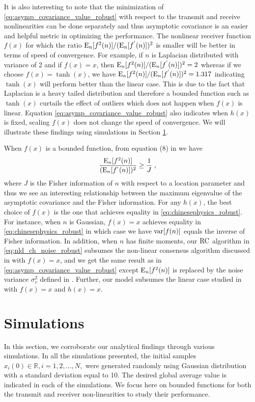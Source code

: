 \documentclass[onecolumn, draft, 12pt]{IEEEtran}
\newcommand{\E}{{\rm E}}
\newcommand{\R}{\mathbb{R}}
\newcommand{\rnld}{\rm RC}
\begin{document}
It is also interesting to note that the minimization of \eqref{eq:asymp_covariance_value_robust} with respect to the transmit and receive nonlinearities can be done separately and thus asymptotic covariance is an easier and helpful metric in optimizing the performance. The nonlinear receiver function $f(x)$ for which the ratio $ \E_n [f^2(n)] / (\E_n[f^{'}(n)])^2 $ is smaller will be better in terms of speed of convergence. For example, if $n$ is Laplacian distributed with variance of 2 and if $f(x)=x$, then $\E_n [f^2(n)] / (\E_n[f^{'}(n)])^2 =2$ whereas if we choose $f(x)=\tanh(x)$, we have $\E_n [f^2(n)] / (\E_n[f^{'}(n)])^2 =1.317$ indicating $\tanh(x)$ will perform better than the linear case. This is due to the fact that Laplacian is a heavy tailed distribution and therefore a bounded function such as $\tanh(x)$ curtails the effect of outliers which does not happen when $f(x)$ is linear. Equation \eqref{eq:asymp_covariance_value_robust} also indicates when $h(x)$ is fixed, scaling $f(x)$ does not change the speed of convergence. We will illustrate these findings using simulations in Section \ref{sec:simulations_nld_robust}. 

When $f(x)$ is a bounded function, from equation (8) in \cite{chinesephysics} we have
\begin{equation}
\label{eq:chinesephysics_robust}
\frac{\E_n [f^2(n)]}{(\E_n[f^{'}(n)])^2} \geq \frac{1}{J} \;,
\end{equation}
where $J$ is the Fisher information of $n$ with respect to a location parameter \cite[(8)]{zamir} and thus we see an interesting relationship between the maximum eigenvalue of the asymptotic covariance and the Fisher information. For any $h(x)$, the best choice of $f(x)$ is the one that achieves equality in \eqref{eq:chinesephysics_robust}. For instance, when $n$ is Gaussian, $f(x)=x$ achieves equality in \eqref{eq:chinesephysics_robust} in which case we have  ${\rm var}[f(n)]$ equals the inverse of Fisher information. In addition, when $n$ has finite moments, our $\rnld$ algorithm in \eqref{eq:nld_ch_noise_robust} subsumes the non-linear consensus algorithm discussed in \cite{dastep2013} with $f(x)=x$, and we get the same result as in \eqref{eq:asymp_covariance_value_robust} except $\E_n [f^2(n)]$ is replaced by the noise variance $\sigma^2_{v}$ defined in \cite{dastep2013}. Further, our model subsumes the linear case studied in \cite{MinyiHuang2008} with $f(x)=x$ and $h(x)=x$. 

\section{Simulations} \label{sec:simulations_nld_robust}
In this section, we corroborate our analytical findings through various simulations. In all the simulations presented, the initial samples $x_i(0) \in \R, i=1,2, \ldots, N,$ were generated randomly using Gaussian distribution with a standard deviation equal to 10. The desired global average value is indicated in each of the simulations. We focus here on bounded functions for both the transmit and receiver non-linearities to study their performance. 
 
\end{document}
